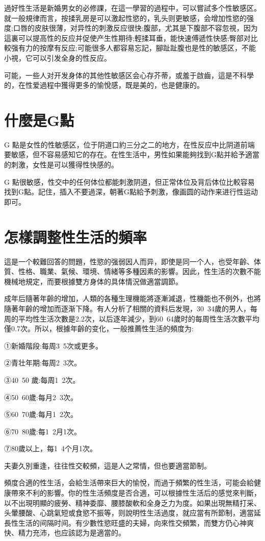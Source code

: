 \documentclass[12pt,UTF8]{ctexbook}
\begin{document}
過好性生活是新婚男女的必修課，在這一學習的過程中，可以嘗試多个性敏感区。就一般規律而言，按揉乳房是可以激起性慾的，乳头则更敏感，会增加性慾的强度;口唇的皮肤很薄，对异性的刺激反应很快;腹部，尤其是下腹部不容忽視，因为這裏可以提高性的反应并促使产生性期待;輕揉耳垂，能快速傅遞性快感;臀部对比較强有力的按摩有反应;可能很多人都容易忘記，腳趾趾腹也是性的敏感区，不能小視，它可以引发全身的性反应。

可能，一些人对开发身体的其他性敏感区会心存芥蒂，或羞于啟齒，這是不科學的，在性爱過程中獲得更多的愉悅感，既是美的，也是健康的。

\section{什麼是G點}

G 點是女性的性敏感区，位于阴道口約三分之二的地方，在性反应中比阴道前端要敏感，但不容易感知它的存在。在性生活中，男性如果能夠找到G點并給予適當的刺激，女性是可以獲得性快感的。

G 點很敏感，性交中的任何体位都能刺激阴道，但正常体位及背后体位比較容易找到G點。記住，插入不要過深，朝著G點給予刺激，像画圆的动作来进行性运动即可。

\section{怎樣調整性生活的頻率}

這是一个較難回答的問題，性慾的强弱因人而异，即使是同一个人，也受年齡、体質、性格、職業、氣候、環境、情緒等多種因素的影響。因此，性生活的次數不能機械地規定，而要根據雙方身体的具体情況做適當調節。

成年后隨著年齡的增加，人類的各種生理機能將逐漸減退，性機能也不例外，也將隨著年齡的增加而逐渐下降。有人分析了相關的資料后发現，30~34歲的男人，每周的平均性生活次數是2.2次，以后逐年減少，到60~64歲时的每周性生活次數平均僅0.7次。所以，根據年齡的变化，一般推薦性生活的頻度为:

①新婚階段:每周3~5次或更多。

②青壮年期:每周2~3次。

③40~50 歲:每周1~2次。

④50~60歲:每月2~3次。

⑤60~70歲:每月1~2次。

⑥70~80歲:每1~2月1次。

⑦80歲以上，每1~4个月1次。

夫妻久別重逢，往往性交較頻，這是人之常情，但也要適當節制。

頻度合適的性生活，会給生活帶來巨大的愉悅，而過于頻繁的性生活，可能会給健康帶來不利的影響。你的性生活頻度是否合適，可以根據性生活后的感觉來判斷，以不出現明顯的疲勞、精神委靡、腰膝酸軟和全身乏力为度。如果出現無精打采、头暈腰酸、心跳氣短或食慾不振等，则說明性生活過度，就应當有所節制，適當延長性生活的间隔时间。有少數性慾旺盛的夫婦，向來性交頻繁，而雙方仍心神爽快、精力充沛，也应該認为是適當的。
\end{document}
